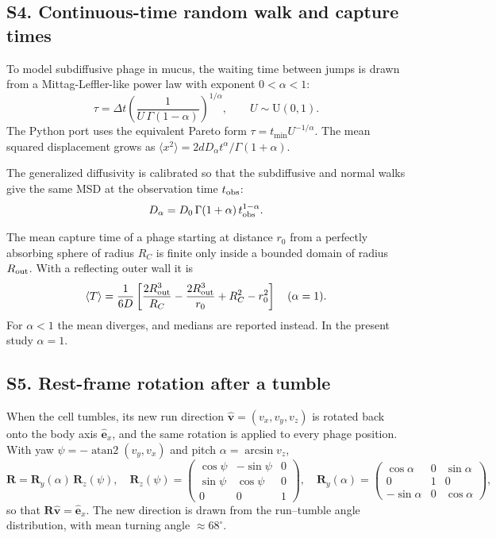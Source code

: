 \subsection*{S4. Continuous-time random walk and capture times}
To model subdiffusive phage in mucus, the waiting time between jumps is drawn from a Mittag-Leffler-like power law with exponent $0<\alpha<1$\cite{metzler2000random,joiner2019impact}:
\begin{equation}
\tau=\Delta t\left(\frac{1}{U\,\Gamma(1-\alpha)}\right)^{1/\alpha},\qquad U\sim\mathrm U(0,1).
\end{equation}
The Python port uses the equivalent Pareto form $\tau=t_{\min}U^{-1/\alpha}$. The mean squared displacement grows as $\langle x^2\rangle=2dD_\alpha t^\alpha/\Gamma(1+\alpha)$.

The generalized diffusivity is calibrated so that the subdiffusive and normal walks give the same MSD at the observation time $t_{\rm obs}$:
\begin{equation}
D_\alpha=D_0\,\Gamma(1+\alpha)\,t_{\rm obs}^{1-\alpha}.
\end{equation}

The mean capture time of a phage starting at distance $r_0$ from a perfectly absorbing sphere of radius $R_C$ is finite only inside a bounded domain of radius $R_{\rm out}$. With a reflecting outer wall it is
\begin{equation}
\langle T\rangle=\frac{1}{6D}\left[\frac{2R_{\rm out}^3}{R_C}-\frac{2R_{\rm out}^3}{r_0}+R_C^2-r_0^2\right]\quad(\alpha=1).
\end{equation}
For $\alpha<1$ the mean diverges, and medians are reported instead\cite{joiner2019impact}. In the present study $\alpha=1$.

\subsection*{S5. Rest-frame rotation after a tumble}
When the cell tumbles, its new run direction $\hat{\bm v}=(v_x,v_y,v_z)$ is rotated back onto the body axis $\hat{\bm e}_x$, and the same rotation is applied to every phage position. With yaw $\psi=-\operatorname{atan2}(v_y,v_x)$ and pitch $\alpha=\arcsin v_z$,
\begin{equation}
\bm R=\bm R_y(\alpha)\,\bm R_z(\psi),\quad
\bm R_z(\psi)=\begin{pmatrix}\cos\psi&-\sin\psi&0\\ \sin\psi&\cos\psi&0\\0&0&1\end{pmatrix},\quad
\bm R_y(\alpha)=\begin{pmatrix}\cos\alpha&0&\sin\alpha\\0&1&0\\-\sin\alpha&0&\cos\alpha\end{pmatrix},
\end{equation}
so that $\bm R\hat{\bm v}=\hat{\bm e}_x$. The new direction is drawn from the run--tumble angle distribution, with mean turning angle $\approx68^\circ$\cite{berg2004coli}.

